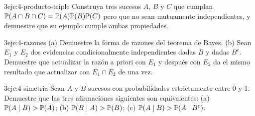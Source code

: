 \begin{ejercicio}{3}{eje:4-producto-triple}
Construya tres sucesos $A$, $B$ y $C$ que cumplan $\mathbb{P}(A\cap B\cap C)=\mathbb{P}(A)\mathbb{P}(B)\mathbb{P}(C)$ pero que no sean mutuamente independientes, y demuestre que su ejemplo cumple ambas propiedades.
\end{ejercicio}

\begin{ejercicio}{3}{eje:4-razones}
(a) Demuestre la forma de razones del teorema de Bayes. (b) Sean $E_1$ y $E_2$ dos evidencias condicionalmente independientes dadas $B$ y dadas $B^{c}$. Demuestre que actualizar la razón a priori con $E_1$ y después con $E_2$ da el mismo resultado que actualizar con $E_1\cap E_2$ de una vez.
\end{ejercicio}

\begin{ejercicio}{3}{eje:4-simetria}
Sean $A$ y $B$ sucesos con probabilidades estrictamente entre 0 y 1. Demuestre que las tres afirmaciones siguientes son equivalentes: (a) $\mathbb{P}(A\mid B)>\mathbb{P}(A)$; (b) $\mathbb{P}(B\mid A)>\mathbb{P}(B)$; (c) $\mathbb{P}(A\mid B)>\mathbb{P}(A\mid B^{c})$.
\end{ejercicio}
